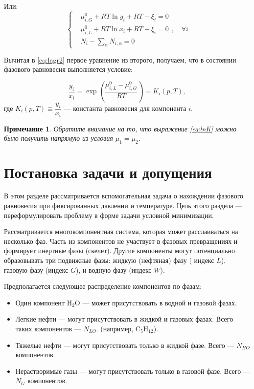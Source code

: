 ﻿\documentclass[12pt]{article}
\newtheorem{note}{Примечание}[section]
\begin{document}
Или:
\begin{equation}
\left\{
\begin{aligned}
& \mu_{i, G}^0 + RT \ln y_i + RT - \xi_i = 0\\
& \mu_{i, L}^0 + RT \ln x_i + RT - \xi_i = 0\\
& N_i - \sum_{\alpha} N_{i,\alpha} = 0
\end{aligned}
\label{eq:lagr2} \right.,\quad\forall i
\end{equation}

Вычитая в \eqref{eq:lagr2} первое уравнение из второго, получаем, что в состоянии фазового равновесия выполняется
условие:

\begin{equation}
\frac{y_i}{x_i} = \exp \left(\frac{\mu_{i, L}^0 - \mu_{i, G}^0}{RT}\right) = K_i(p,T), \label{eq:lnK}
\end{equation}
где $K_i(p,T) \equiv \dfrac{y_i}{x_i}$ --- константа равновесия для компонента $i$.


\begin{note}
Обратите внимание на то, что выражение \eqref{eq:lnK} можно было получить напрямую из условия $\mu_1 = \mu_2$.
\end{note}


\section{Постановка задачи и допущения}

В этом разделе рассматривается вспомогательная задача о нахождении фазового равновесия при фиксированных давлении и
температуре. Цель этого раздела --- переформулировать проблему в форме задачи условной минимизации.

Рассматривается многокомпонентная система, которая может расслаиваться на несколько фаз. Часть из компонентов не
участвует в фазовых превращениях и формирует инертные фазы (скелет). Другие компоненты могут потенциально образовывать
три подвижные фазы: жидкую (нефтяная) фазу ( индекс $L$), газовую фазу (индекс $G$), и водную фазу (индекс $W$).

Предполагается следующее распределение компонентов по фазам:
\begin{itemize}
\item Один компонент $\mathrm{H_2O}$ --- может присутствовать в водной и газовой фазах. \item Легкие нефти --- могут
присутствовать в жидкой и газовых фазах. Всего таких компонентов --- $N_{LO}$. (например, $\mathrm{C_5H_{12}}$). \item
Тяжелые нефти --- могут присутствовать только в жидкой фазе. Всего --- $N_{HO}$ компонентов. \item Нерастворимые газы
--- могут присутствовать только в газовой фазе. Всего --- $N_{G}$ компонентов.
\end{itemize}
\end{document}
